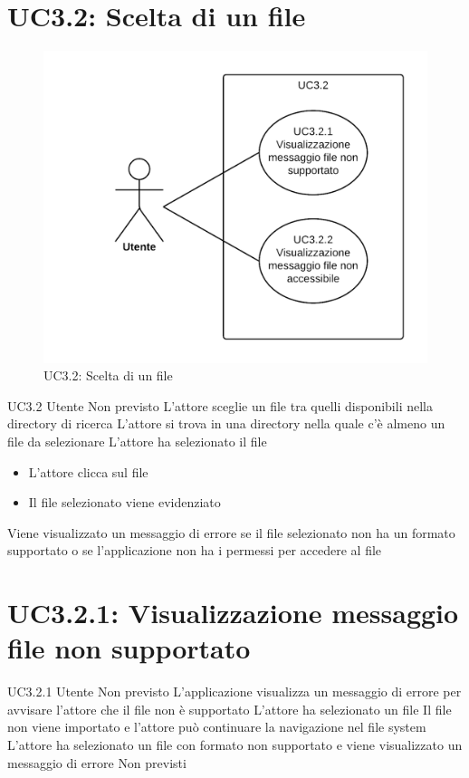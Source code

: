 \documentclass[../AnalisideiRequisiti.tex]{subfiles}
\begin{document}
	\section{UC3.2: Scelta di un file}
	\begin{figure}[H]
		\centering
		\includegraphics[width=\textwidth]{../img/UC3_2.png}
		\caption{UC3.2: Scelta di un file}
	\end{figure}
\UserCase
{UC3.2}
{Utente}
{Non previsto}
{L'attore sceglie un file tra quelli disponibili nella directory di ricerca}
{L'attore si trova in una directory nella quale c'è almeno un file da selezionare}
{L'attore ha selezionato il file}
{
	\begin{itemize}
		\item{} L'attore clicca sul file
		\item{} Il file selezionato viene evidenziato
	\end{itemize}
}
{Viene visualizzato un messaggio di errore se il file selezionato non ha un formato supportato  o se l'applicazione non ha i permessi per accedere al file }

\section{UC3.2.1: Visualizzazione messaggio file non supportato}
\UserCase
{UC3.2.1}
{Utente}
{Non previsto}
{L'applicazione visualizza un messaggio di errore per avvisare l'attore che il file non è supportato}
{L'attore ha selezionato un file }
{Il file non viene importato e l'attore può continuare la navigazione nel file system}
{L'attore ha selezionato un file con formato non supportato e viene visualizzato un messaggio di errore}
{Non previsti}
\end{document}
